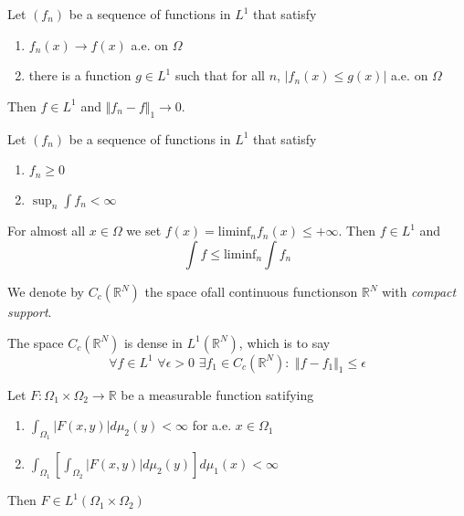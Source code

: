 \begin{thm}
	Let $ (f_{n}) $ be a sequence of functions in $ L^{1} $ that satisfy
	\begin{enumerate}
		\item $ f_{n}(x) \to f(x) $ a.e. on $ \Omega $
		\item there is a function $ g \in L^{1} $ such that for all $ n $, $ \vert f_{n}(x) \leq g(x) \vert $ a.e. on $ \Omega $
	\end{enumerate}
	Then $ f \in L^{1} $ and $ \Vert f_{n} - f \Vert_{1} \to 0 $.
\end{thm}

\begin{lem}
	Let $ (f_{n}) $ be a sequence of functions in $ L^{1} $ that satisfy
	\begin{enumerate}
		\item $ f_{n} \geq 0 $
		\item $ \sup_{n} \int f_{n} < \infty $
	\end{enumerate}
	For almost all $ x \in \Omega $ we set $ f(x) = \mathrm{liminf}_{n} f_{n}(x) \leq + \infty $. Then $ f \in L^{1} $ and
	\[
	\int f \leq \mathrm{liminf}_{n} \int f_{n}
	\]
	
\end{lem}

\begin{defn}
	We denote by $ C_{c} \left( \mathbb{R}^{N} \right) $ the space ofall continuous functionson $ \mathbb{R}^{N} $ with \textit{compact support}.
\end{defn}

\begin{thm}[density]
	The space $ C_{c} \left( \mathbb{R}^{N} \right) $ is dense in $ L^{1} \left( \mathbb{R}^{N} \right) $, which is to say
	\[
		\forall f \in L^{1} \hspace{4pt} \forall \epsilon > 0 \hspace{4pt} \exists f_{1} \in C_{c} \left( \mathbb{R}^{N} \right): \hspace{4pt} \Vert f-f_{1} \Vert_{1} \leq \epsilon
	\]
	
\end{thm}

\begin{thm}[Tonelli]
Let $ F: \Omega_{1} \times \Omega_{2} \to \mathbb{R} $ be a measurable function satifying
\begin{enumerate}
	\item $ \int_{ \Omega_{1}} \vert F(x,y) \vert d \mu_{2}(y) < \infty $ for a.e. $ x \in \Omega_{1} $
	\item $ \int_{ \Omega_{1}} \left[ \int_{ \Omega_{2}} \vert F(x,y) \vert d \mu_{2}(y) \right] d \mu_{1}(x) < \infty $
\end{enumerate}
Then $ F \in L^{1}( \Omega_{1} \times \Omega_{2} ) $
\end{thm}


